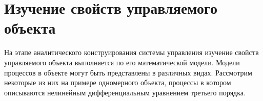 \section{Изучение свойств управляемого объекта}
На этапе аналитического конструирования системы управления  изучение свойств управляемого объекта выполняется по его математической модели. Модели процессов в объекте могут быть представлены в различных видах. Рассмотрим некоторые из них на примере одномерного объекта, процессы в котором описываются нелинейным дифференциальным уравнением третьего порядка.


